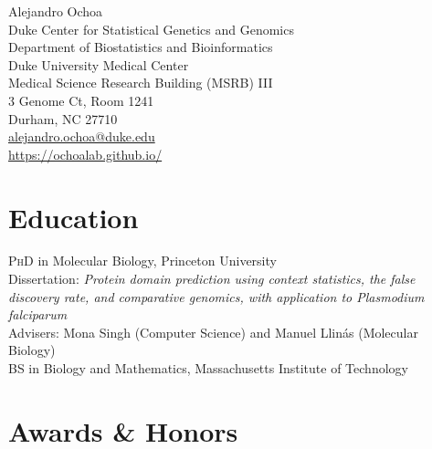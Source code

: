 \documentclass[12pt]{article} %
\newcommand{\years}[1]{\marginnote{\scriptsize #1}} %
\begin{document}
\begin{center}
  {\LARGE Alejandro Ochoa}\\[0.5cm] %
  Duke Center for Statistical Genetics and Genomics\\
  Department of Biostatistics and Bioinformatics\\
  Duke University Medical Center\\
  Medical Science Research Building (MSRB) III\\
  3 Genome Ct, Room 1241\\
  Durham, NC 27710\\
  \href{mailto:alejandro.ochoa@duke.edu}{alejandro.ochoa@duke.edu}\\ %
  \url{https://ochoalab.github.io/} \\ %
\end{center}



\section*{Education}

\years{2013}\textsc{PhD} in Molecular Biology, Princeton University\\
Dissertation: \emph{Protein domain prediction using context statistics, the false discovery rate, and comparative genomics, with application to Plasmodium falciparum}\\
Advisers: Mona Singh (Computer Science) and Manuel Llinás (Molecular Biology)\\
\years{2006}\textsc{BS} in Biology and Mathematics, Massachusetts Institute of Technology

\section*{Awards \& Honors}
\end{document}
